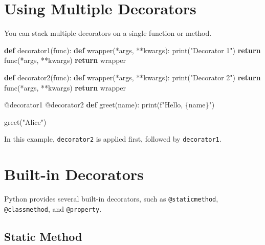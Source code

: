 \documentclass[
  letterpaper,
  DIV=11,
  numbers=noendperiod]{scrreprt}
\newenvironment{Shaded}{\begin{snugshade}}{\end{snugshade}}
\newcommand{\AttributeTok}[1]{\textcolor[rgb]{0.40,0.45,0.13}{#1}}
\newcommand{\BuiltInTok}[1]{\textcolor[rgb]{0.00,0.23,0.31}{#1}}
\newcommand{\ControlFlowTok}[1]{\textcolor[rgb]{0.00,0.23,0.31}{\textbf{#1}}}
\newcommand{\KeywordTok}[1]{\textcolor[rgb]{0.00,0.23,0.31}{\textbf{#1}}}
\newcommand{\NormalTok}[1]{\textcolor[rgb]{0.00,0.23,0.31}{#1}}
\newcommand{\OperatorTok}[1]{\textcolor[rgb]{0.37,0.37,0.37}{#1}}
\newcommand{\SpecialCharTok}[1]{\textcolor[rgb]{0.37,0.37,0.37}{#1}}
\newcommand{\SpecialStringTok}[1]{\textcolor[rgb]{0.13,0.47,0.30}{#1}}
\newcommand{\StringTok}[1]{\textcolor[rgb]{0.13,0.47,0.30}{#1}}
\begin{document}
\section{Using Multiple Decorators}\label{using-multiple-decorators}

You can stack multiple decorators on a single function or method.

\begin{Shaded}
\begin{Highlighting}[]
\KeywordTok{def}\NormalTok{ decorator1(func):}
    \KeywordTok{def}\NormalTok{ wrapper(}\OperatorTok{*}\NormalTok{args, }\OperatorTok{**}\NormalTok{kwargs):}
        \BuiltInTok{print}\NormalTok{(}\StringTok{"Decorator 1"}\NormalTok{)}
        \ControlFlowTok{return}\NormalTok{ func(}\OperatorTok{*}\NormalTok{args, }\OperatorTok{**}\NormalTok{kwargs)}
    \ControlFlowTok{return}\NormalTok{ wrapper}

\KeywordTok{def}\NormalTok{ decorator2(func):}
    \KeywordTok{def}\NormalTok{ wrapper(}\OperatorTok{*}\NormalTok{args, }\OperatorTok{**}\NormalTok{kwargs):}
        \BuiltInTok{print}\NormalTok{(}\StringTok{"Decorator 2"}\NormalTok{)}
        \ControlFlowTok{return}\NormalTok{ func(}\OperatorTok{*}\NormalTok{args, }\OperatorTok{**}\NormalTok{kwargs)}
    \ControlFlowTok{return}\NormalTok{ wrapper}

\AttributeTok{@decorator1}
\AttributeTok{@decorator2}
\KeywordTok{def}\NormalTok{ greet(name):}
    \BuiltInTok{print}\NormalTok{(}\SpecialStringTok{f"Hello, }\SpecialCharTok{\{}\NormalTok{name}\SpecialCharTok{\}}\SpecialStringTok{"}\NormalTok{)}

\NormalTok{greet(}\StringTok{"Alice"}\NormalTok{)}
\end{Highlighting}
\end{Shaded}

In this example, \texttt{decorator2} is applied first, followed by
\texttt{decorator1}.

\section{Built-in Decorators}\label{built-in-decorators}

Python provides several built-in decorators, such as
\texttt{@staticmethod}, \texttt{@classmethod}, and \texttt{@property}.

\subsection{Static Method}\label{static-method}
\end{document}
